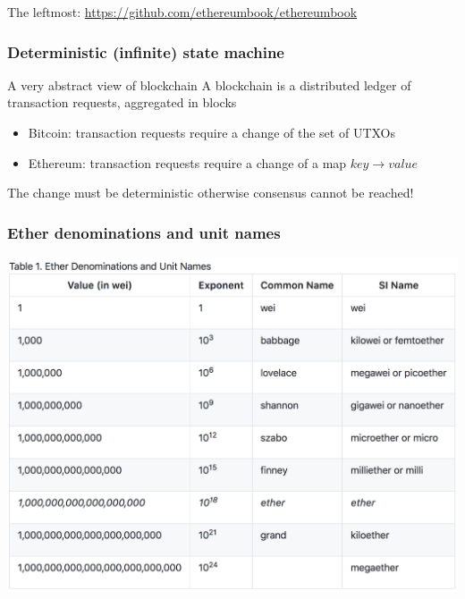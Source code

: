 \documentclass[11pt]{beamer}  %
\begin{document}
\begin{frame}
  \begin{center}
    The leftmost: \url{https://github.com/ethereumbook/ethereumbook}
  \end{center}

\end{frame}

\begin{frame}\frametitle{Deterministic (infinite) state machine}

  \begin{greenbox}{A very abstract view of blockchain}
    A blockchain is a distributed ledger of transaction requests, aggregated in blocks
    \begin{itemize}
    \item[] \hspace*{-3ex}\alert{Bitcoin:} transaction requests require a change of the set of UTXOs
    \item[] \hspace*{-3ex}\alert{Ethereum:} transaction requests require a change of a
      map $\mathit{key}\to\mathit{value}$
    \end{itemize}
    The change must be \alert{deterministic} otherwise consensus cannot be reached!
  \end{greenbox}

\end{frame}

\begin{frame}\frametitle{Ether denominations and unit names}

  \begin{center}
    \includegraphics[scale=0.2,clip=false]{pictures/ether-denominations.png}
  \end{center}

\end{frame}
\end{document}
